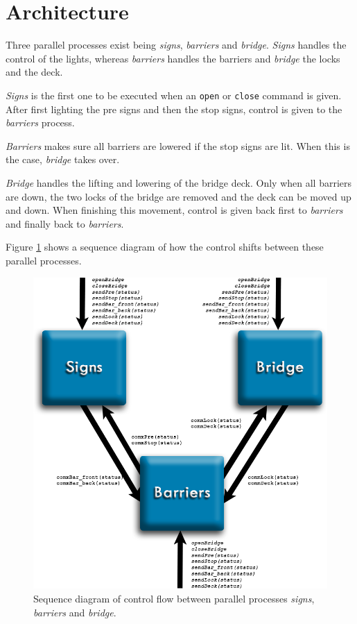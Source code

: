 \section{Architecture}
\label{sec:act}

Three parallel processes exist being \emph{signs}, \emph{barriers} and \emph{bridge}. \emph{Signs} handles the control of the lights, whereas \emph{barriers} handles the barriers and \emph{bridge} the locks and the deck.

\emph{Signs} is the first one to be executed when an \texttt{open} or \texttt{close} command is given. After first lighting the pre signs and then the stop signs, control is given to the \emph{barriers} process.

\emph{Barriers} makes sure all barriers are lowered if the stop signs are lit. When this is the case, \emph{bridge} takes over.

\emph{Bridge} handles the lifting and lowering of the bridge deck. Only when all barriers are down, the two locks of the bridge are removed and the deck can be moved up and down. When finishing this movement, control is given back first to \emph{barriers} and finally back to \emph{barriers}.

Figure \ref{fig:arch} shows a sequence diagram of how the control shifts between these parallel processes.
%
\begin{figure}%
\centering
\includegraphics[width=0.5\columnwidth]{Images/Architecture}%
\caption{Sequence diagram of control flow between parallel processes \emph{signs}, \emph{barriers} and \emph{bridge}.}%
\label{fig:arch}%
\end{figure}

